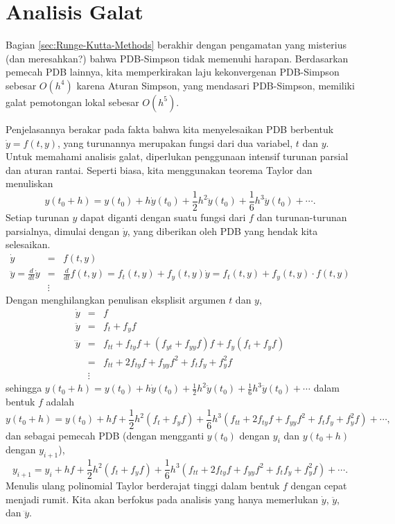 
\section{Analisis Galat\label{sec:Runge-Kutta-Error-Analysis}}

Bagian \ref{sec:Runge-Kutta-Methods} berakhir dengan pengamatan yang
misterius (dan meresahkan?) bahwa PDB-Simpson tidak memenuhi harapan.
Berdasarkan pemecah PDB lainnya, kita memperkirakan laju kekonvergenan
PDB-Simpson sebesar $O(h^{4})$ karena Aturan Simpson, yang mendasari
PDB-Simpson, memiliki galat pemotongan lokal sebesar $O(h^{5})$.

Penjelasannya berakar pada fakta bahwa kita menyelesaikan PDB berbentuk
$\dot{y}=f(t,y)$, yang turunannya merupakan fungsi dari dua variabel,
$t$ dan $y$. Untuk memahami analisis galat, diperlukan penggunaan
intensif turunan parsial dan aturan rantai. Seperti biasa, kita menggunakan
teorema Taylor dan menuliskan
\[
y(t_{0}+h)=y(t_{0})+h\dot{y}(t_{0})+\frac{1}{2}h^{2}\ddot{y}(t_{0})+\frac{1}{6}h^{3}\dddot{y}(t_{0})+\cdots.
\]
Setiap turunan $y$ dapat diganti dengan suatu fungsi dari $f$ dan
turunan-turunan parsialnya, dimulai dengan $\dot{y}$, yang diberikan
oleh PDB yang hendak kita selesaikan.
\begin{eqnarray*}
\dot{y} & = & f(t,y)\\
\ddot{y}=\frac{d}{dt}\dot{y} & = & \frac{d}{dt}f(t,y)=f_{t}(t,y)+f_{y}(t,y)\dot{y}=f_{t}(t,y)+f_{y}(t,y)\cdot f(t,y)\\
 & \vdots
\end{eqnarray*}
Dengan menghilangkan penulisan eksplisit argumen $t$ dan $y$,
\begin{eqnarray*}
\dot{y} & = & f\\
\ddot{y} & = & f_{t}+f_{y}f\\
\dddot{y} & = & f_{tt}+f_{ty}f+(f_{yt}+f_{yy}f)f+f_{y}(f_{t}+f_{y}f)\\
 & = & f_{tt}+2f_{ty}f+f_{yy}f^{2}+f_{t}f_{y}+f_{y}^{2}f\\
 & \vdots
\end{eqnarray*}
sehingga $y(t_{0}+h)=y(t_{0})+h\dot{y}(t_{0})+\frac{1}{2}h^{2}\ddot{y}(t_{0})+\frac{1}{6}h^{3}\dddot{y}(t_{0})+\cdots$
dalam bentuk $f$ adalah
\[
y(t_{0}+h)=y(t_{0})+hf+\frac{1}{2}h^{2}(f_{t}+f_{y}f)+\frac{1}{6}h^{3}(f_{tt}+2f_{ty}f+f_{yy}f^{2}+f_{t}f_{y}+f_{y}^{2}f)+\cdots,
\]
dan sebagai pemecah PDB (dengan mengganti $y(t_{0})$ dengan $y_{i}$
dan $y(t_{0}+h)$ dengan $y_{i+1}$),
\begin{equation}
y_{i+1}=y_{i}+hf+\frac{1}{2}h^{2}(f_{t}+f_{y}f)+\frac{1}{6}h^{3}(f_{tt}+2f_{ty}f+f_{yy}f^{2}+f_{t}f_{y}+f_{y}^{2}f)+\cdots.\label{eq:twoVariableTaylorSeries}
\end{equation}
Menulis ulang polinomial Taylor berderajat tinggi dalam bentuk $f$
dengan cepat menjadi rumit. Kita akan berfokus pada analisis yang
hanya memerlukan $\dot{y}$, $\ddot{y}$, dan $\dddot{y}$.

